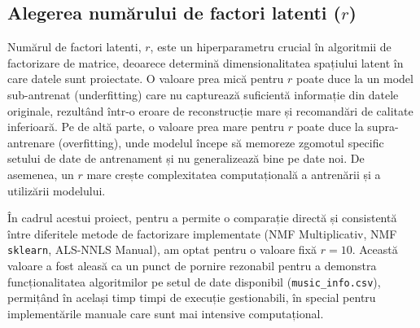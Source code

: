 \documentclass[12pt,a4paper]{article}
\begin{document}
	\subsection{Alegerea numărului de factori latenti ($r$)}
	\label{subsec:alegerea-r}
	
	Numărul de factori latenti, $r$, este un hiperparametru crucial în algoritmii de factorizare de matrice, deoarece determină dimensionalitatea spațiului latent în care datele sunt proiectate. O valoare prea mică pentru $r$ poate duce la un model sub-antrenat (underfitting) care nu capturează suficientă informație din datele originale, rezultând într-o eroare de reconstrucție mare și recomandări de calitate inferioară. Pe de altă parte, o valoare prea mare pentru $r$ poate duce la supra-antrenare (overfitting), unde modelul începe să memoreze zgomotul specific setului de date de antrenament și nu generalizează bine pe date noi. De asemenea, un $r$ mare crește complexitatea computațională a antrenării și a utilizării modelului.
	
	În cadrul acestui proiect, pentru a permite o comparație directă și consistentă între diferitele metode de factorizare implementate (NMF Multiplicativ, NMF \texttt{sklearn}, ALS-NNLS Manual), am optat pentru o valoare fixă $r = 10$. Această valoare a fost aleasă ca un punct de pornire rezonabil pentru a demonstra funcționalitatea algoritmilor pe setul de date disponibil (\texttt{music\_info.csv}), permițând în același timp timpi de execuție gestionabili, în special pentru implementările manuale care sunt mai intensive computațional.
	
\end{document}
